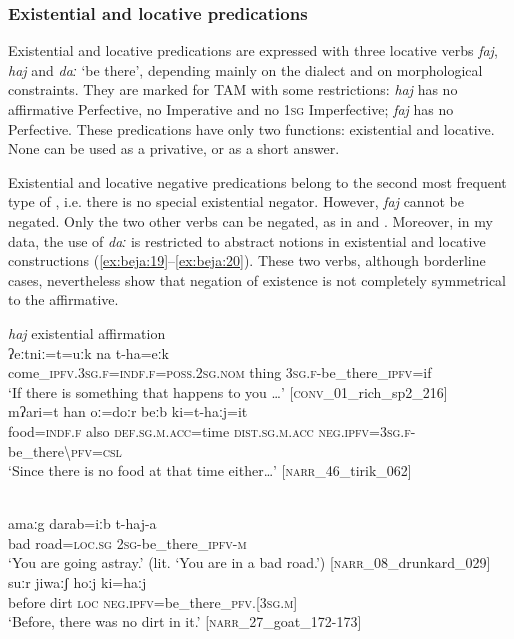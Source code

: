 \documentclass[output=paper,colorlinks,citecolor=brown]{langscibook}
\begin{document}
\subsubsection{Existential and locative predications}
\label{sec:beja:2.3.2}

Existential and locative predications are expressed with three locative verbs \textit{faj}, \textit{haj} and \textit{daː} ‘be there’, depending mainly on the dialect and on morphological constraints. They are marked for TAM with some restrictions: \textit{haj} has no affirmative Perfective, no Imperative and no 1\textsc{sg} Imperfective; \textit{faj} has no Perfective. These predications have only two functions: existential and locative. None can be used as a privative, or as a short answer.

Existential and locative negative predications belong to the second most frequent type of \citet{Veselinova2013lexicalization}, i.e. there is no special existential negator. However, \textit{faj} cannot be negated. Only the two other verbs can be negated, as in  and . Moreover, in my data, the use of \textit{daː} is restricted to abstract notions in existential and locative constructions (\ref{ex:beja:19}--\ref{ex:beja:20}). These two verbs, although borderline cases, nevertheless show that negation of existence is not completely symmetrical to the affirmative.

\ea\label{ex:beja:18}
\ea \textit{haj} existential affirmation \\
    \gll ʔeːtniː=t=uːk na t-ha=eːk\\
    come\_\textsc{ipfv.3sg.f=indf.f=poss.2sg.nom} thing \textsc{3sg.f}-be\_there\_\textsc{ipfv}=if\\
    \glt ‘If there is something that happens to you …’ \textsc{[conv}\_01\_rich\_sp2\_216]
    \\
    \gll mʔari=t han  oː=doːr beːb ki=t-haːj=it\\
         food=\textsc{indf.f} also  \textsc{def.sg.m.acc}=time \textsc{dist.sg.m.acc} \textsc{neg.ipfv=3sg.f-}be\_there{\textbackslash}\textsc{pfv=csl}\\
    \glt `Since there is no food at that time either…' \textsc{[narr}\_46\_tirik\_062]
\z \z

\ea\label{ex:beja:18+}
\\
    \gll amaːg	darab=iːb	t-haj-a \\
        bad	road=\textsc{loc.sg}	\textsc{2sg}-be\_there\_\textsc{ipfv-m} \\
    \glt ‘You are going astray.’ (lit. ‘You are in a bad road.’) [\textsc{narr}\_08\_drunkard\_029]
\\
    \gll suːr jiwaːʃ hoːj ki=haːj \\
        before dirt \textsc{loc} \textsc{neg.ipfv}=be\_there\_\textsc{pfv.[3sg.m]} \\
    \glt ‘Before, there was no dirt in it.’ [\textsc{narr}\_27\_goat\_172-173]
\z \z
\end{document}
